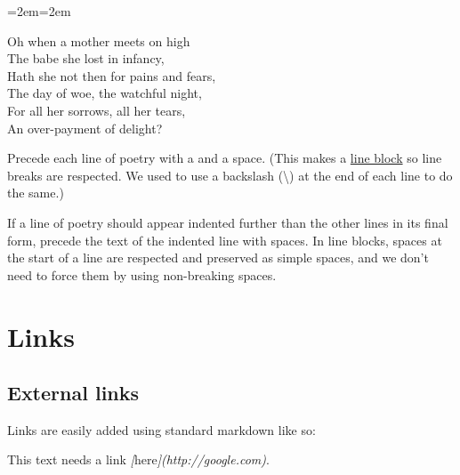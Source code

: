 \documentclass[
]{book}
\newenvironment{Shaded}{\begin{snugshade}}{\end{snugshade}}
\newcommand{\CommentTok}[1]{\textcolor[rgb]{0.56,0.35,0.01}{\textit{#1}}}
\newcommand{\NormalTok}[1]{#1}
\newcommand{\OtherTok}[1]{\textcolor[rgb]{0.56,0.35,0.01}{#1}}
\newenvironment{poetry}[0]{\par\leftskip=2em\rightskip=2em}{\par\medskip}
\begin{document}
\begin{poetry}

Oh when a mother meets on high\\
The babe she lost in infancy,\\
Hath she not then for pains and fears,\\
\hspace*{0.333em}\hspace*{0.333em}\hspace*{0.333em}\hspace*{0.333em}The day of woe, the watchful night,\\
For all her sorrows, all her tears,\\
\hspace*{0.333em}\hspace*{0.333em}\hspace*{0.333em}\hspace*{0.333em}An over-payment of delight?

\end{poetry}

Precede each line of poetry with a \textbar{} and a space. (This makes a \href{https://pandoc.org/MANUAL.html\#line-blocks}{line block} so line breaks are respected. We used to use a backslash (\textbackslash) at the end of each line to do the same.)

If a line of poetry should appear indented further than the other lines in its final form, precede the text of the indented line with spaces. In line blocks, spaces at the start of a line are respected and preserved as simple spaces, and we don't need to force them by using non-breaking spaces.

\hypertarget{links}{%
\chapter{Links}\label{links}}

\hypertarget{external-links}{%
\section{External links}\label{external-links}}

Links are easily added using standard markdown like so:

\begin{Shaded}
\begin{Highlighting}[]
\NormalTok{This text needs a link }\CommentTok{[}\OtherTok{here}\CommentTok{](http://google.com)}\NormalTok{.}
\end{Highlighting}
\end{Shaded}
\end{document}
